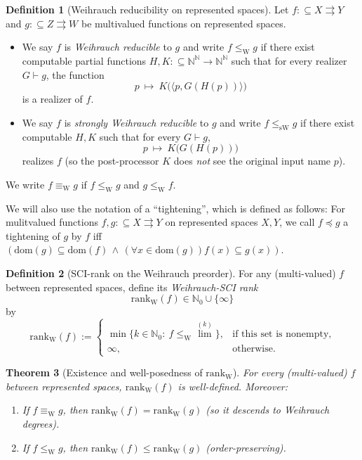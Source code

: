 \documentclass{lmcs} %
\theoremstyle{plain}
\theoremstyle{plain}
\newtheorem{theorem}{Theorem}[section]
\theoremstyle{definition}
\newtheorem{definition}[theorem]{Definition}
\theoremstyle{remark}
\theoremstyle{definition}
\theoremstyle{remark}
\numberwithin{equation}{section}
\newcommand{\N}{\mathbb{N}}
\newcommand{\Baire}{\N^\N}
\newcommand{\dom}{\mathrm{dom}}
\newcommand{\pairWhite}[2]{\langle #1,#2\rangle}
\newcommand{\Lim}{\operatorname{lim}}
\newcommand{\Limi}[1]{\Lim^{(#1)}}
\begin{document}
\begin{definition}[Weihrauch reducibility on represented spaces]\label{def:weihrauch}
Let $f:\subseteq X\rightrightarrows Y$ and $g:\subseteq Z\rightrightarrows W$
be multivalued functions on represented spaces.

\begin{itemize}
\item We say $f$ is \textit{Weihrauch reducible} to $g$ and write $f\leq_{\mathrm W} g$
if there exist computable partial functions $H,K:\subseteq \Baire \to \Baire$ such that
for every realizer $G\vdash g$, the function
\[
p \ \mapsto\ K\bigl(\pairWhite{p}{G(H(p))}\bigr)
\]
is a realizer of $f$.

\item We say $f$ is \textit{strongly Weihrauch reducible} to $g$ and write
$f\leq_{\mathrm{sW}} g$ if there exist computable $H,K$ such that for every $G\vdash g$,
\[
p \ \mapsto\ K\bigl(G(H(p))\bigr)
\]
realizes $f$ (so the post-processor $K$ does \textit{not} see the original input name $p$).
\end{itemize}

We write $f\equiv_{\mathrm W}g$ if $f\leq_{\mathrm W}g$ and $g\leq_{\mathrm W}f$.
\end{definition}

We will also use the notation of a \enquote{tightening}, which is defined as follows: For mulitvalued functions $f,g:\subseteq X \rightrightarrows Y$ on represented spaces $X,Y$, we call $f \preceq g$ a tightening of $g$ by $f$ iff $(\dom(g) \subseteq \dom(f) \, \land \, (\forall x \in \dom(g)) f(x) \subseteq g(x))$.

\begin{definition}[SCI-rank on the Weihrauch preorder]\label{def:rank}
For any (multi-valued) $f$ between represented spaces, define its \textit{Weihrauch-SCI rank}
\[
\mathrm{rank}_{\mathrm{W}}(f) \in \N_0\cup\{\infty\}
\]
by
\[
\mathrm{rank}_{\mathrm{W}}(f)
:=
\begin{cases}
\min\{k\in\N_0:\ f\le_{\mathrm{W}} \Limi{k}\}, & \text{if this set is nonempty,}\\
\infty, & \text{otherwise.}
\end{cases}
\]
\end{definition}

\begin{theorem}[Existence and well-posedness of $\mathrm{rank}_{\mathrm{W}}$]\label{thm:rank-wellposed}
For every (multi-valued) $f$ between represented spaces, $\mathrm{rank}_{\mathrm{W}}(f)$ is well-defined.
Moreover:
\begin{enumerate}
\item If $f\equiv_{\mathrm{W}} g$, then $\mathrm{rank}_{\mathrm{W}}(f)=\mathrm{rank}_{\mathrm{W}}(g)$ (so it descends to Weihrauch degrees).
\item If $f\le_{\mathrm{W}} g$, then $\mathrm{rank}_{\mathrm{W}}(f)\le \mathrm{rank}_{\mathrm{W}}(g)$ (order-preserving).
\end{enumerate}
\end{theorem}
\end{document}
